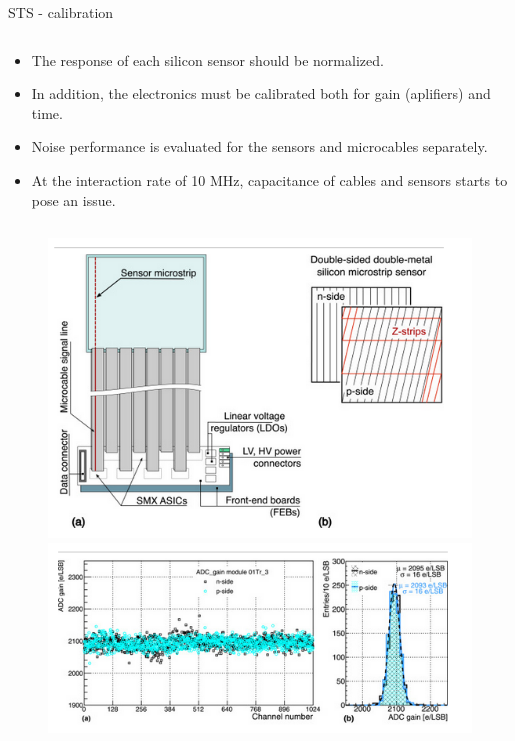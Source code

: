 \begin{columnframe}{STS - calibration}
    \begin{column}{0.5\textwidth}
        \begin{itemize}
            \item The response of each silicon sensor should be normalized.
            \item In addition, the electronics must be calibrated both for
                  gain (aplifiers) and time.
            \item Noise performance is evaluated for the sensors and microcables
                  separately.
            \item At the interaction rate of 10 MHz, capacitance of cables and sensors
                  starts to pose an issue.
        \end{itemize}
    \end{column}
    \begin{column}{0.5\textwidth}
        \begin{figure}
            \centering
            \includegraphics[width=\textwidth]{images/sts_microstrip_silicon.png}
            \includegraphics[width=\textwidth]{images/sts_calibration_plots.png}
        \end{figure}
    \end{column}
\end{columnframe}

